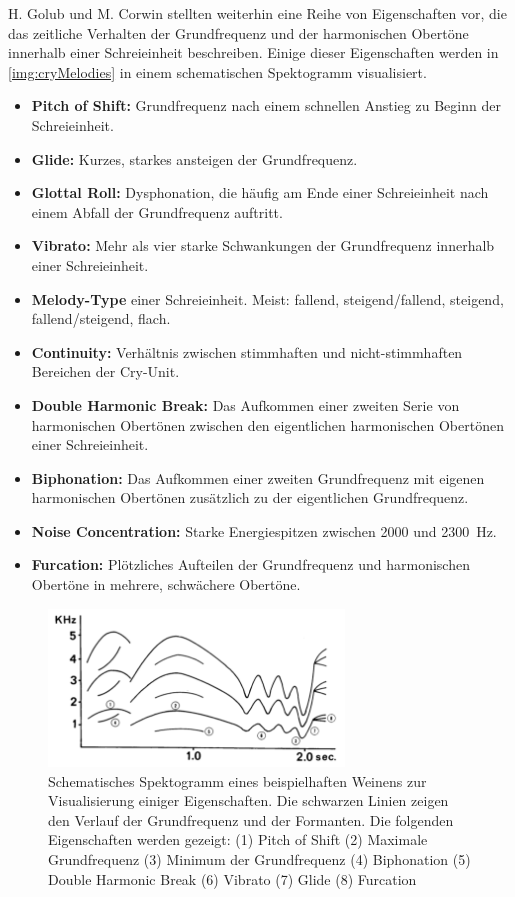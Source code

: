 H. Golub und M. Corwin stellten weiterhin eine Reihe von Eigenschaften vor, die das zeitliche Verhalten der Grundfrequenz und der harmonischen Obertöne innerhalb einer Schreieinheit beschreiben.\cite[S. 73]{cryModel} Einige dieser Eigenschaften werden in \autoref{img:cryMelodies} in einem schematischen Spektogramm visualisiert.
\begin{itemize}
	\item \textbf{Pitch of Shift:} Grundfrequenz nach einem schnellen Anstieg zu Beginn der Schreieinheit.
	\item \textbf{Glide:} Kurzes, starkes ansteigen der Grundfrequenz.
	\item  \textbf{Glottal Roll:} Dysphonation, die häufig am Ende einer Schreieinheit nach einem Abfall der Grundfrequenz auftritt.
	\item  \textbf{Vibrato:} Mehr als vier starke Schwankungen der Grundfrequenz innerhalb einer Schreieinheit.
	\item  \textbf{Melody-Type } einer Schreieinheit. Meist: fallend, steigend/fallend, steigend, fallend/steigend, flach. 
	\item  \textbf{Continuity:} Verhältnis zwischen stimmhaften und nicht-stimmhaften Bereichen der Cry-Unit.
	\item  \textbf{Double Harmonic Break:} Das Aufkommen einer zweiten Serie von harmonischen Obertönen zwischen den eigentlichen harmonischen Obertönen einer Schreieinheit.
	\item  \textbf{Biphonation:} Das Aufkommen einer zweiten Grundfrequenz mit eigenen harmonischen Obertönen zusätzlich zu der eigentlichen Grundfrequenz.
	\item  \textbf{Noise Concentration:} Starke Energiespitzen zwischen 2000 und \SI{2300}{\hertz}.
	\item  \textbf{Furcation:} Plötzliches Aufteilen der Grundfrequenz und harmonischen Obertöne in mehrere, schwächere Obertöne.
\end{itemize}

\begin{figure}[H]
	\centering
	\includegraphics[width=0.7\textwidth]{bilder/melodyTypes.png}
	\caption[Schematisches Spektogramm eines beispielhaften Weinens]{Schematisches Spektogramm eines beispielhaften Weinens zur Visualisierung einiger Eigenschaften. Die schwarzen Linien zeigen  den Verlauf der Grundfrequenz und der Formanten. Die folgenden Eigenschaften werden gezeigt: (1) Pitch of Shift (2) Maximale Grundfrequenz (3) Minimum der Grundfrequenz (4) Biphonation (5) Double Harmonic Break (6) Vibrato (7) Glide (8) Furcation \cite[S. 142]{signal}}
	\label{img:cryMelodies}
\end{figure}

